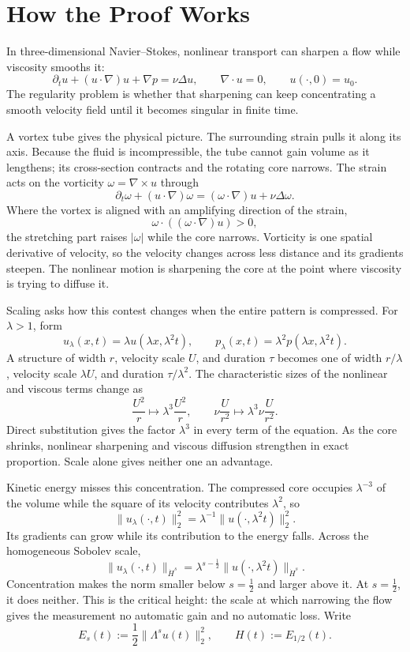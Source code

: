 \documentclass[11pt]{article}
\begin{document}
\section*{How the Proof Works}

In three-dimensional Navier--Stokes, nonlinear transport can sharpen a flow while viscosity smooths it:
\[
\partial_tu+(u\cdot\nabla)u+\nabla p=\nu\Delta u,
\qquad \nabla\cdot u=0,
\qquad u(\cdot,0)=u_0.
\]
The regularity problem is whether that sharpening can keep concentrating a smooth velocity field until it becomes singular in finite time.

A vortex tube gives the physical picture. The surrounding strain pulls it along its axis. Because the fluid is incompressible, the tube cannot gain volume as it lengthens; its cross-section contracts and the rotating core narrows. The strain acts on the vorticity \(\omega=\nabla\times u\) through
\[
\partial_t\omega+(u\cdot\nabla)\omega
=(\omega\cdot\nabla)u+\nu\Delta\omega.
\]
Where the vortex is aligned with an amplifying direction of the strain,
\[
\omega\cdot((\omega\cdot\nabla)u)>0,
\]
the stretching part raises \(\lvert\omega\rvert\) while the core narrows. Vorticity is one spatial derivative of velocity, so the velocity changes across less distance and its gradients steepen. The nonlinear motion is sharpening the core at the point where viscosity is trying to diffuse it.

Scaling asks how this contest changes when the entire pattern is compressed. For \(\lambda>1\), form
\[
u_\lambda(x,t)=\lambda u(\lambda x,\lambda^2t),
\qquad
p_\lambda(x,t)=\lambda^2p(\lambda x,\lambda^2t).
\]
A structure of width \(r\), velocity scale \(U\), and duration \(\tau\) becomes one of width \(r/\lambda\), velocity scale \(\lambda U\), and duration \(\tau/\lambda^2\). The characteristic sizes of the nonlinear and viscous terms change as
\[
\frac{U^2}{r}
\longmapsto
\lambda^3\frac{U^2}{r},
\qquad
\nu\frac{U}{r^2}
\longmapsto
\lambda^3\nu\frac{U}{r^2}.
\]
Direct substitution gives the factor \(\lambda^3\) in every term of the equation. As the core shrinks, nonlinear sharpening and viscous diffusion strengthen in exact proportion. Scale alone gives neither one an advantage.

Kinetic energy misses this concentration. The compressed core occupies \(\lambda^{-3}\) of the volume while the square of its velocity contributes \(\lambda^2\), so
\[
\|u_\lambda(\cdot,t)\|_2^2
=\lambda^{-1}\|u(\cdot,\lambda^2t)\|_2^2.
\]
Its gradients can grow while its contribution to the energy falls. Across the homogeneous Sobolev scale,
\[
\|u_\lambda(\cdot,t)\|_{\dot H^s}
=\lambda^{s-\frac12}
\|u(\cdot,\lambda^2t)\|_{\dot H^s}.
\]
Concentration makes the norm smaller below \(s=\tfrac12\) and larger above it. At \(s=\tfrac12\), it does neither. This is the critical height: the scale at which narrowing the flow gives the measurement no automatic gain and no automatic loss. Write
\[
E_s(t):=\frac12\|\Lambda^su(t)\|_2^2,
\qquad
H(t):=E_{1/2}(t).
\]
\end{document}
